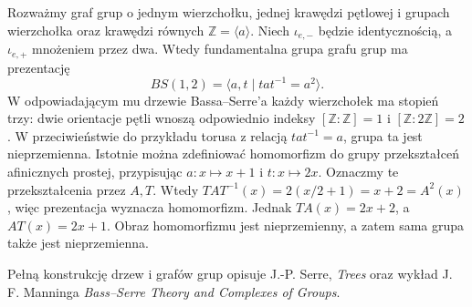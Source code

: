 \begin{przyklad}
Rozważmy graf grup o jednym wierzchołku, jednej
krawędzi pętlowej i grupach wierzchołka oraz
krawędzi równych $\mathbb Z=\langle a\rangle$.
Niech $\iota_{e,-}$ będzie identycznością,
a $\iota_{e,+}$ mnożeniem przez dwa.
Wtedy fundamentalna grupa grafu grup ma prezentację
\[
BS(1,2)=\langle a,t\mid tat^{-1}=a^2\rangle.
\]
W odpowiadającym mu drzewie Bassa--Serre'a
każdy wierzchołek ma stopień trzy:
dwie orientacje pętli wnoszą odpowiednio indeksy
$[\mathbb Z:\mathbb Z]=1$ i
$[\mathbb Z:2\mathbb Z]=2$.
W przeciwieństwie do przykładu torusa
z relacją $tat^{-1}=a$,
grupa ta jest nieprzemienna. Istotnie
można zdefiniować homomorfizm do grupy
przekształceń afinicznych prostej,
przypisując $a:x\mapsto x+1$ i
$t:x\mapsto 2x$. Oznaczmy te przekształcenia przez $A,T$.
Wtedy $TAT^{-1}(x)=2(x/2+1)=x+2=A^2(x)$,
więc prezentacja wyznacza homomorfizm.
Jednak $TA(x)=2x+2$, a $AT(x)=2x+1$.
Obraz homomorfizmu jest nieprzemienny,
a zatem sama grupa także jest nieprzemienna.
\end{przyklad}

\begin{uwaga}[Literatura]
Pełną konstrukcję drzew i grafów grup opisuje J.-P. Serre,
\emph{Trees} oraz wykład J. F. Manninga
\emph{Bass--Serre Theory and Complexes of Groups}.
\end{uwaga}
